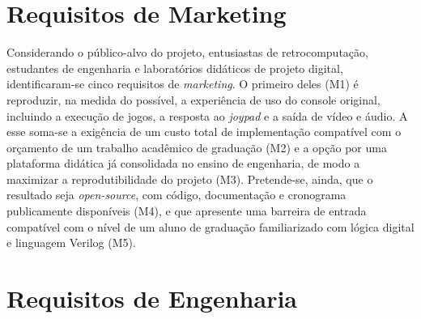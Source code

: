 \documentclass[pnumromarab,times]{politex}
\begin{document}
\section{Requisitos de Marketing}
\label{sec:req-marketing}

Considerando o público-alvo do projeto, entusiastas de
retrocomputação, estudantes de engenharia e laboratórios didáticos de
projeto digital, identificaram-se cinco requisitos de
\emph{marketing}. O primeiro deles (M1) é reproduzir, na medida do
possível, a experiência de uso do console original, incluindo a
execução de jogos, a resposta ao \textit{joypad} e a saída de vídeo e
áudio. A esse soma-se a exigência de um custo total de implementação
compatível com o orçamento de um trabalho acadêmico de graduação
(M2) e a opção por uma plataforma didática já consolidada no ensino
de engenharia, de modo a maximizar a reprodutibilidade do projeto
(M3). Pretende-se, ainda, que o resultado seja \emph{open-source},
com código, documentação e cronograma publicamente disponíveis (M4),
e que apresente uma barreira de entrada compatível com o nível de um
aluno de graduação familiarizado com lógica digital e linguagem
Verilog (M5).


\section{Requisitos de Engenharia}
\label{sec:req-engenharia}
\end{document}
